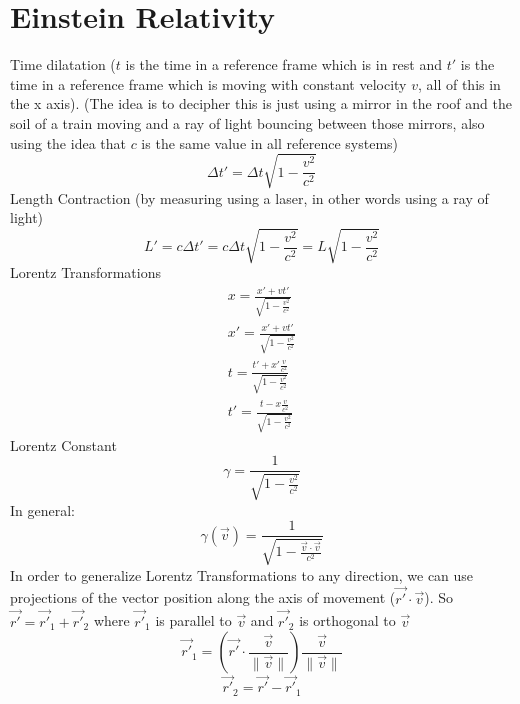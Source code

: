 \documentclass{article}
\begin{document}
\section{Einstein Relativity}
Time dilatation ($t$ is the time in a reference frame which is in rest and $t'$ is the time in a reference frame which is moving with constant velocity $v$, all of this in the x axis). (The idea is to decipher this is just using a mirror in the roof and the soil of a train moving and a ray of light bouncing between those mirrors, also using the idea that $c$ is the same value in all reference systems)
\begin{equation}
  \Delta t' = \Delta t \sqrt{1 - \frac{v^2}{c^2}}
\end{equation}
Length Contraction (by measuring using a laser, in other words using a ray of light)
\begin{equation}
  L' = c\Delta t' = c\Delta t \sqrt{1 - \frac{v^2}{c^2}} = L\sqrt{1 - \frac{v^2}{c^2}}
\end{equation}
Lorentz Transformations
\begin{equation}
  \begin{split}
    x = \frac{x' + vt'}{\sqrt{1 - \frac{v^2}{c^2}}}\\
    x' = \frac{x' + vt'}{\sqrt{1 - \frac{v^2}{c^2}}}\\
      t = \frac{t' + x'\frac{v}{c^2}}{\sqrt{1 - \frac{v^2}{c^2}}}\\
      t' = \frac{t - x\frac{v}{c^2}}{\sqrt{1 - \frac{v^2}{c^2}}}
  \end{split}
\end{equation}
Lorentz Constant
\begin{equation}
  \gamma = \frac{1}{\sqrt{1-\frac{v^2}{c^2}}}
\end{equation}
In general:
\begin{equation}
  \gamma(\vec{v}) = \frac{1}{\sqrt{1-\frac{\vec{v}\cdot \vec{v}}{c^2}}}
\end{equation}
In order to generalize Lorentz Transformations to any direction, we can use projections of the vector position along the axis of movement ($\vec{r'} \cdot \vec{v}$). So $\vec{r'} = \vec{r'}_1 + \vec{r'}_2$ where $\vec{r'}_1$ is parallel to $\vec{v}$ and $\vec{r'}_2$ is orthogonal to $\vec{v}$
\begin{equation}
  \vec{r'}_1 = (\vec{r'} \cdot \frac{\vec{v}}{\|\vec{v}\|} )\frac{\vec{v}}{\|\vec{v}\|}
\end{equation}
\begin{equation}
  \vec{r'}_2 = \vec{r'} - \vec{r'}_1
\end{equation}
\end{document}
